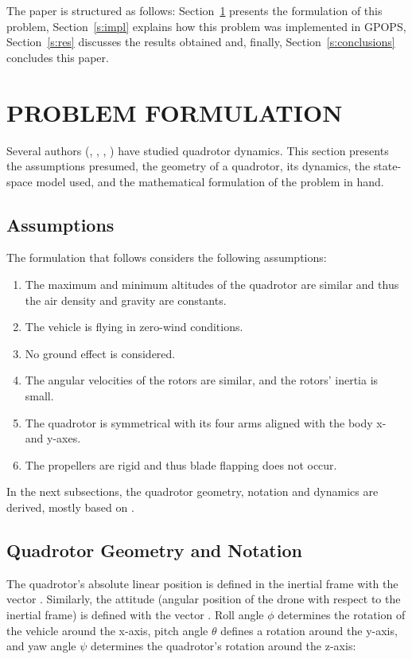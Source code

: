 \documentclass[letterpaper, 10 pt, conference]{ieeeconf}  %
\begin{document}
The paper is structured as follows: Section~\ref{s:problem} presents the formulation of this problem, Section~\ref{s:impl} explains how this problem was implemented in GPOPS, Section~\ref{s:res} discusses the results obtained and, finally, Section~\ref{s:conclusions} concludes this paper.


\section{PROBLEM FORMULATION}\label{s:problem}

Several authors (\cite{bouabdallah2007full}, \cite{chovancova2014mathematical}, \cite{luukkonen2011modelling}, \cite{beard2008quadrotor}) have studied quadrotor dynamics. This section presents the assumptions presumed, the geometry of a quadrotor, its dynamics, the state-space model used, and the mathematical formulation of the problem in hand.

\subsection{Assumptions}

The formulation that follows considers the following assumptions:
\begin{enumerate}
	\item The maximum and minimum altitudes of the quadrotor are similar and thus the air density and gravity are constants.
	\item The vehicle is flying in zero-wind conditions.
	\item No ground effect is considered.
	\item \label{as:Ir} The angular velocities of the rotors are similar, and the rotors' inertia is small.
	\item \label{as:inertia} The quadrotor is symmetrical with its four arms aligned with the body x- and y-axes.
	\item The propellers are rigid and thus blade flapping does not occur.
\end{enumerate}

In the next subsections, the quadrotor geometry, notation and dynamics are derived, mostly based on \cite{luukkonen2011modelling}.

\subsection{Quadrotor Geometry and Notation}

The quadrotor's absolute linear position is defined in the inertial frame with the vector \bm{$\xi$}. Similarly, the attitude (angular position of the drone with respect to the inertial frame) is defined with the vector \bm{$\eta$}. Roll angle $\phi$ determines the rotation of the vehicle around the x-axis, pitch angle $\theta$ defines a rotation around the y-axis, and yaw angle $\psi$ determines the quadrotor's rotation around the z-axis:
\end{document}
